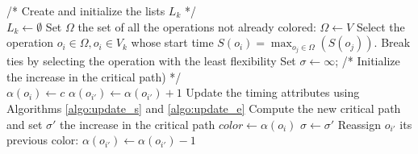 \begin{algorithm}[htb]		
	/* Create and initialize the lists $L_k$ */\\
	{
		$L_k \leftarrow \emptyset$\;
	}
	Set $\Omega$ the set of all the operations not already colored: $\Omega \leftarrow V$\;
	\While{$\Omega \neq \emptyset$}
	{
		Select the operation $o_i \in \Omega, o_i \in V_k$ whose start time $S(o_i) = \max_{o_j \in \Omega}(S(o_j))$. Break ties by selecting the operation with the least flexibility\;	
		Set $\sigma \leftarrow \infty$; /* Initialize the increase in the critical path) */\\
		{
			{
				{
					$\alpha(o_i) \leftarrow c$\;
						{
								$\alpha(o_{i'}) \leftarrow \alpha(o_{i'}) + 1$\;
								Update the timing attributes using Algorithms \ref{algo:update_s} and \ref{algo:update_e}\;
						}
						Compute the new critical path and set $\sigma'$ the increase in the critical path\;
							{
								$color \leftarrow \alpha(o_i)$\;
								$\sigma \leftarrow \sigma'$\;
							}
							{
								Reassign $o_{i'}$ its previous color: $\alpha(o_{i'}) \leftarrow \alpha(o_{i'})-1$\;
							}
				}
}}}
\end{algorithm}
